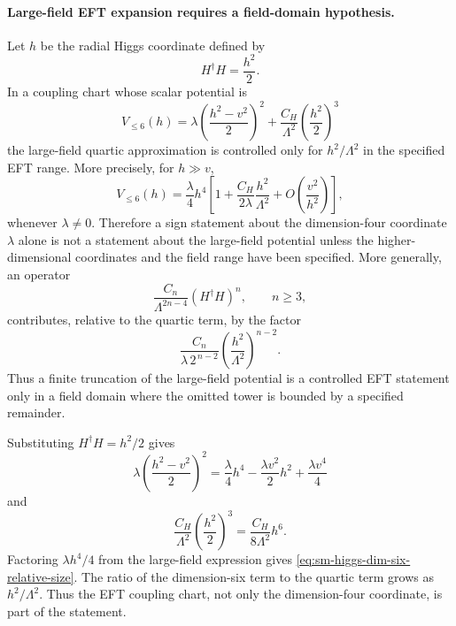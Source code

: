 \paragraph{Large-field EFT expansion requires a field-domain hypothesis.}
Let \(h\) be the radial Higgs coordinate defined by
\[
  H^\dagger H=\frac{h^2}{2}.
\]
In a coupling chart whose scalar potential is
\begin{equation}
  V_{\leq 6}(h)
  =
  \lambda\left(\frac{h^2-v^2}{2}\right)^2
  +
  \frac{C_H}{\Lambda^2}\left(\frac{h^2}{2}\right)^3
  \label{eq:sm-higgs-radial-potential-dim-six}
\end{equation}
the large-field quartic approximation is controlled only for
\(h^2/\Lambda^2\) in the specified EFT range.  More precisely, for
\(h\gg v\),
\begin{equation}
  V_{\leq 6}(h)
  =
  \frac{\lambda}{4}h^4
  \left[
    1+\frac{C_H}{2\lambda}\frac{h^2}{\Lambda^2}
    +O\!\left(\frac{v^2}{h^2}\right)
  \right],
  \label{eq:sm-higgs-dim-six-relative-size}
\end{equation}
whenever \(\lambda\neq0\).  Therefore a sign statement about the
dimension-four coordinate \(\lambda\) alone is not a statement about the
large-field potential unless the higher-dimensional coordinates and the field
range have been specified.  More generally, an operator
\begin{equation}
  \frac{C_n}{\Lambda^{2n-4}}(H^\dagger H)^n,\qquad n\geq3,
  \label{eq:sm-higgs-general-large-field-operator}
\end{equation}
contributes, relative to the quartic term, by the factor
\begin{equation}
  \frac{C_n}{\lambda\,2^{\,n-2}}
  \left(\frac{h^2}{\Lambda^2}\right)^{n-2}.
  \label{eq:sm-higgs-general-large-field-ratio}
\end{equation}
Thus a finite truncation of the large-field potential is a controlled EFT
statement only in a field domain where the omitted tower is bounded by a
specified remainder.

Substituting \(H^\dagger H=h^2/2\) gives
\[
  \lambda\left(\frac{h^2-v^2}{2}\right)^2
  =
  \frac{\lambda}{4}h^4
  -\frac{\lambda v^2}{2}h^2
  +\frac{\lambda v^4}{4}
\]
and
\[
  \frac{C_H}{\Lambda^2}\left(\frac{h^2}{2}\right)^3
  =
  \frac{C_H}{8\Lambda^2}h^6 .
\]
Factoring \(\lambda h^4/4\) from the large-field expression gives
\eqref{eq:sm-higgs-dim-six-relative-size}.  The ratio of the dimension-six
term to the quartic term grows as \(h^2/\Lambda^2\).  Thus the EFT coupling
chart, not only the dimension-four coordinate, is part of the statement.

